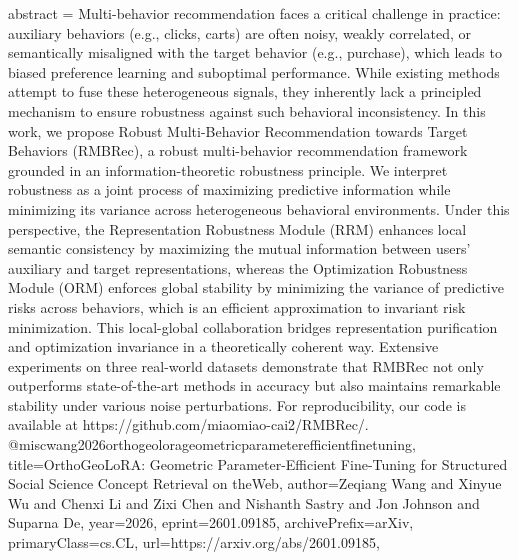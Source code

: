 {      abstract = {Multi-behavior recommendation faces a critical challenge in practice: auxiliary behaviors (e.g., clicks, carts) are often noisy, weakly correlated, or semantically misaligned with the target behavior (e.g., purchase), which leads to biased preference learning and suboptimal performance. While existing methods attempt to fuse these heterogeneous signals, they inherently lack a principled mechanism to ensure robustness against such behavioral inconsistency.   In this work, we propose Robust Multi-Behavior Recommendation towards Target Behaviors (RMBRec), a robust multi-behavior recommendation framework grounded in an information-theoretic robustness principle. We interpret robustness as a joint process of maximizing predictive information while minimizing its variance across heterogeneous behavioral environments. Under this perspective, the Representation Robustness Module (RRM) enhances local semantic consistency by maximizing the mutual information between users' auxiliary and target representations, whereas the Optimization Robustness Module (ORM) enforces global stability by minimizing the variance of predictive risks across behaviors, which is an efficient approximation to invariant risk minimization. This local-global collaboration bridges representation purification and optimization invariance in a theoretically coherent way. Extensive experiments on three real-world datasets demonstrate that RMBRec not only outperforms state-of-the-art methods in accuracy but also maintains remarkable stability under various noise perturbations. For reproducibility, our code is available at https://github.com/miaomiao-cai2/RMBRec/.}
}@misc{wang2026orthogeolorageometricparameterefficientfinetuning,
      title={OrthoGeoLoRA: Geometric Parameter-Efficient Fine-Tuning for Structured Social Science Concept Retrieval on theWeb}, 
      author={Zeqiang Wang and Xinyue Wu and Chenxi Li and Zixi Chen and Nishanth Sastry and Jon Johnson and Suparna De},
      year={2026},
      eprint={2601.09185},
      archivePrefix={arXiv},
      primaryClass={cs.CL},
      url={https://arxiv.org/abs/2601.09185},
}
